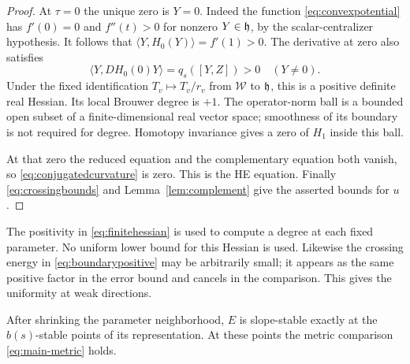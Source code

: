 \begin{proof}
At $\tau=0$ the unique zero is $Y=0$. Indeed the function
\eqref{eq:convexpotential} has $f'(0)=0$ and $f''(t)>0$ for
nonzero $Y\in\mathfrak h$, by the scalar-centralizer hypothesis.
It follows that $\langle Y,H_0(Y)\rangle=f'(1)>0$.
The derivative at zero also satisfies
\begin{equation}\label{eq:finitehessian}
\langle Y,DH_0(0)Y\rangle=q_s([Y,Z])>0\quad(Y\ne0).
\end{equation}
Under the fixed identification $T_v\mapsto T_v/r_v$ from
$\mathcal W$ to $\mathfrak h$, this is a positive definite real Hessian.
Its local Brouwer degree is $+1$. The operator-norm ball is a
bounded open subset of a finite-dimensional real vector space;
smoothness of its boundary is not required for degree. Homotopy
invariance gives a zero of $H_1$ inside this ball.

At that zero the reduced equation and the complementary equation
both vanish, so \eqref{eq:conjugatedcurvature} is zero. This is
the HE equation. Finally \eqref{eq:crossingbounds} and
Lemma~\ref{lem:complement} give the asserted bounds for $u$.
\end{proof}

The positivity in \eqref{eq:finitehessian} is used to compute a
degree at each fixed parameter. No uniform lower bound for this
Hessian is used. Likewise the crossing energy in
\eqref{eq:boundarypositive} may be arbitrarily small; it appears
as the same positive factor in the error bound and cancels in the
comparison. This gives the uniformity at weak directions.

\begin{proposition}\label{prop:actual-stability}
After shrinking the parameter neighborhood, $E$ is slope-stable
exactly at the $b(s)$-stable points of its representation.
At these points the metric comparison \eqref{eq:main-metric} holds.
\end{proposition}

